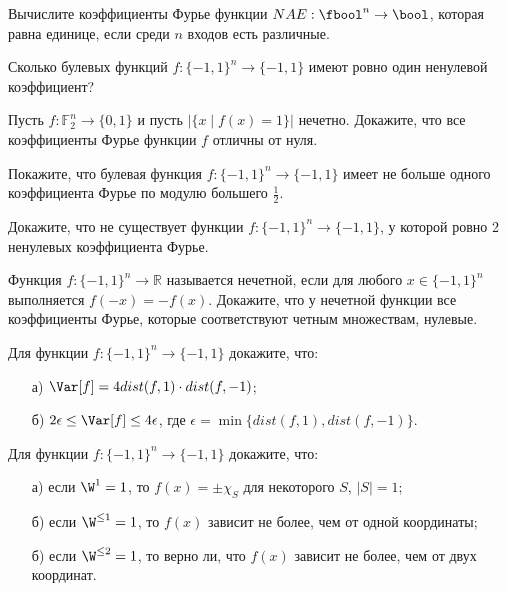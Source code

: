 
\begin{task}
    Вычислите коэффициенты Фурье функции $NAE: \fbool^n \to \bool$, которая равна единице, если среди $n$ входов есть
    различные.
\end{task}


\begin{task}
    Сколько булевых функций $f: \{-1, 1\}^n \to \{-1, 1\}$ имеют ровно один ненулевой коэффициент?
\end{task}

\begin{task}
    Пусть $f: \mathbb{F}_2^n \to \{0, 1\}$ и пусть $|\{x \mid f(x) = 1\}|$ нечетно. Докажите, что все коэффициенты Фурье функции
    $f$ отличны от нуля.
\end{task}


\begin{task}
    Покажите, что булевая функция $f: \{-1, 1\}^n \to \{-1, 1\}$ имеет не больше одного коэффициента Фурье по модулю большего
    $\frac{1}{2}$.
\end{task}


\begin{task}
    Докажите, что не существует функции $f: \{-1, 1\}^n \to \{-1, 1\}$, у которой ровно 2 ненулевых коэффициента Фурье.
\end{task}


\begin{task}
    Функция $f: \{-1, 1\}^n \to \mathbb{R}$ называется нечетной, если для любого $x \in \{-1, 1\}^n$ выполняется $f(-x) =
    -f(x)$. Докажите, что у нечетной функции все коэффициенты Фурье, которые соответствуют четным множествам, нулевые.
\end{task}

\begin{task}
    Для функции $f: \{-1, 1\}^n \to \{-1, 1\}$ докажите, что:
	\begin{enumerate}[topsep = 0pt, itemsep = -1ex]
        \item [а)] $\Var[f] = 4 dist(f, 1) \cdot dist(f, -1)$;
        \item [б)] $2 \epsilon \le \Var[f] \le 4 \epsilon$, где $\epsilon = \min \{dist(f, 1), dist(f, -1)\}$.
	\end{enumerate}
\end{task}


\begin{task}
    Для функции $f: \{-1, 1\}^n \to \{-1, 1\}$ докажите, что:
   	\begin{enumerate}[topsep = 0pt, itemsep = -1ex]
        \item [а)] если $\W^{1} = 1$, то $f(x) = \pm \chi_{S}$ для некоторого $S$, $|S| = 1$;
        \item [б)] если $\W^{\le 1} = 1$, то $f(x)$ зависит не более, чем от одной координаты;
        \item [б)] если $\W^{\le 2} = 1$, то верно ли, что $f(x)$ зависит не более, чем от двух координат.
	\end{enumerate}
\end{task}



